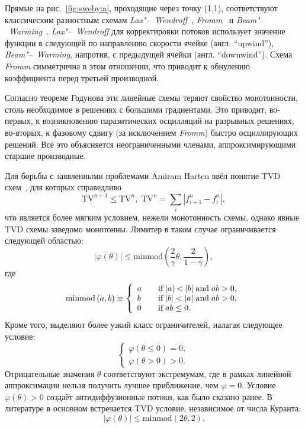 \documentclass[a4paper,10pt]{article}
\newcommand{\TV}{\mathrm{TV}}
\begin{document}
Прямые на рис.~\ref{fig:sweby:a}, проходящие через точку (1,1), соответствуют классическим разностным схемам
\textit{Lax"--~Wendroff}~\cite{Lax1960}, \textit{Fromm}~\cite{Fromm1968} и \textit{Beam"--~Warming}~\cite{Warming1975}.
\textit{Lax"--~Wendroff} для корректировки потоков использует значение функции в следующей по направлению скорости ячейке
(англ. ``upwind''), \textit{Beam"--~Warming}, напротив, с предыдущей ячейки (англ. ``downwind''). Схема \textit{Fromm} симметрична в этом отношении,
что приводит к обнулению коэффициента перед третьей производной.

Согласно теореме Годунова эти линейные схемы теряют свойство монотонности, столь необходимое в решениях с большими градиентами.
Это приводит, во-первых, к возникновению паразитических осцилляций на разрывных решениях,
во-вторых, к фазовому сдвигу (за исключением \textit{Fromm}) быстро осциллирующих решений.
Всё это объясняется неограниченными членами, аппроксимирующими старшие производные.

Для борьбы с заявленными проблемами Amiram Harten ввёл понятие TVD схем~\cite{Harten1983}, для которых справедливо
\[ \TV^{n+1}\le \TV^n, \; \TV^n = \sum_i| f_{i+1}^n - f_i^n |, \]
что является более мягким условием, нежели монотонность схемы, однако явные TVD схемы заведомо монотонны.
Лимитер в таком случае ограничивается следующей областью:
\[ \left|\varphi(\theta)\right| \leq \mathrm{minmod}\left(\frac2{\gamma}\theta,\frac2{1-\gamma}\right), \] где
\[
\mathrm{minmod}\,(a,b) \equiv \left\{
\begin{array}{l l}
	a & \quad \text{if}\;|a|<|b| \;\text{and}\;ab>0, \\
	b & \quad \text{if}\;|b|<|a| \;\text{and}\;ab>0, \\
	0 & \quad \text{if}\;ab \leq 0.
\end{array}\right.
\]
Кроме того, выделяют более узкий класс ограничителей, налагая следующее условие:
\[ \left\{
\begin{array}{l}
	\varphi(\theta\le0)=0, \\
	\varphi(\theta>0) > 0.
\end{array}\right.
\]
Отрицательные значения \(\theta\) соответствуют экстремумам, где в рамках линейной аппроксимации нельзя получить лучшее приближение, чем \(\varphi=0\).
Условие \(\varphi(\theta)>0\) создаёт антидиффузионные потоки, как было сказано ранее.
В литературе в основном встречается TVD условие, независимое от числа Куранта:
\[ \left|\varphi(\theta)\right| \leq \mathrm{minmod}(2\theta,2). \]
\end{document}
